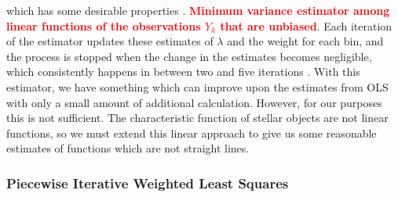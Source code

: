 \documentclass[a4paper,11pt]{article}
\begin{document}
    which has some desirable properties \cite{massey1996estimating}. \textcolor{red}{\textbf{Minimum
    variance estimator among linear functions of the observations $Y_k$ that are
    unbiased}}. Each iteration of the estimator updates these estimates of $\lambda$
    and the weight for each bin, and the process is stopped when the change in the
    estimates becomes negligible, which consistently happens in between two and five
    iterations \cite{massey1996estimating}. With this estimator, we have something
    which can improve upon the estimates from OLS with only a small amount of
    additional calculation. However, for our purposes this is not sufficient. The
    characteristic function of stellar objects are not linear functions, so we must
    extend this linear approach to give us some reasonable estimates of functions
    which are not straight lines.
\subsubsection{Piecewise Iterative Weighted Least Squares}
\label{sec-6-1-3}
\end{document}
